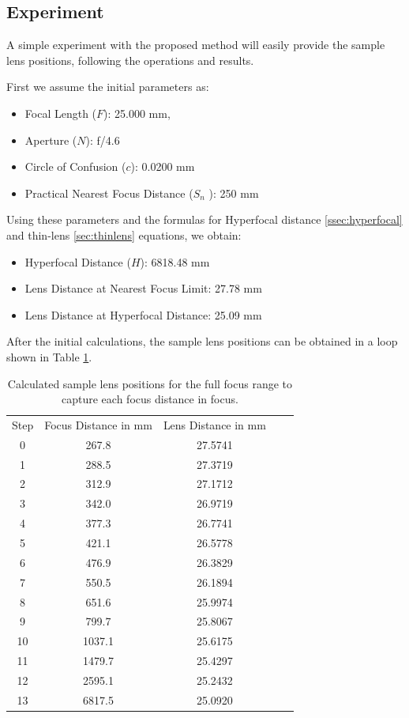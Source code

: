 \documentclass{article}
\begin{document}
\subsection{Experiment}
\label{sec:experiment}
A simple experiment with the proposed method will easily provide the sample lens positions, following the operations and results.

First we assume the initial parameters as: 

\begin{itemize}
    \item Focal Length (\( F\)): 25.000 mm,
    \item Aperture (\( N\)): f/4.6
    \item Circle of Confusion (\( c\)): 0.0200 mm
    \item Practical Nearest Focus Distance (\( S_n\) ): 250 mm
\end{itemize}

Using these parameters and the formulas for Hyperfocal distance \ref{ssec:hyperfocal} and thin-lens \ref{sec:thinlens} equations, we obtain: 

\begin{itemize}
    \item Hyperfocal Distance (\( H\)): 6818.48 mm
    \item Lens Distance at Nearest Focus Limit: 27.78 mm
    \item Lens Distance at Hyperfocal Distance: 25.09 mm
\end{itemize}

After the initial calculations, the sample lens positions can be obtained in a loop shown in  Table \ref{tab:samplelenspos}.

\begin{table}
    \centering
    \begin{tabular}{ccccc}
        Step & Focus Distance in mm & Lens Distance in mm\\
        0&267.8&27.5741\\
        1&288.5&27.3719\\
        2&312.9&27.1712\\
        3&342.0&26.9719\\
        4&377.3&26.7741\\
        5&421.1&26.5778\\
        6&476.9&26.3829\\
        7&550.5&26.1894\\
        8&651.6&25.9974\\
        9&799.7&25.8067\\
        10&1037.1&25.6175\\
        11&1479.7&25.4297\\
        12&2595.1&25.2432\\
        13&6817.5&25.0920\\
    \end{tabular}
    \caption{Calculated sample lens positions for the full focus range to capture each focus distance in focus.}
    \label{tab:samplelenspos}
\end{table}
\end{document}
